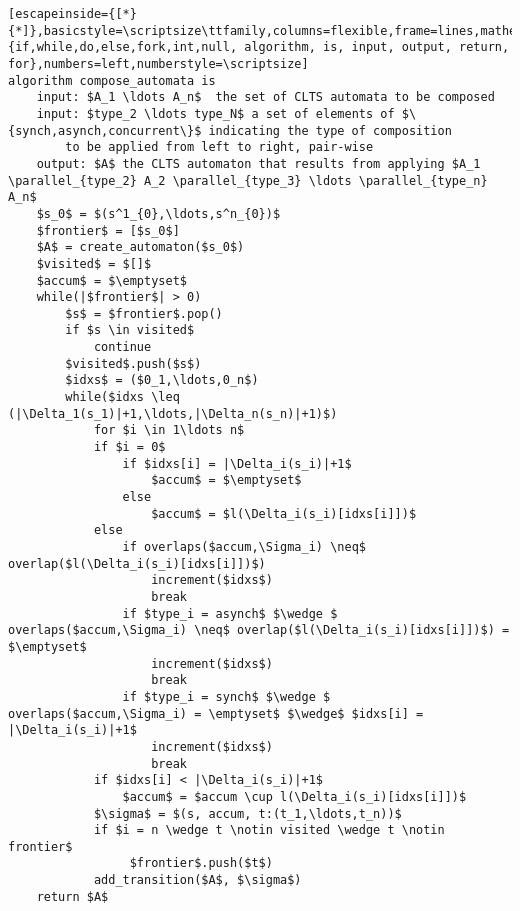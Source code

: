 \renewcommand{\ttdefault}{pcr}
\begin{lstlisting}[escapeinside={[*}{*]},basicstyle=\scriptsize\ttfamily,columns=flexible,frame=lines,mathescape=true,xleftmargin=3.0ex,keywordstyle=\textbf,morekeywords={if,while,do,else,fork,int,null, algorithm, is, input, output, return, for},numbers=left,numberstyle=\scriptsize]
algorithm compose_automata is
	input: $A_1 \ldots A_n$  the set of CLTS automata to be composed
	input: $type_2 \ldots type_N$ a set of elements of $\{synch,asynch,concurrent\}$ indicating the type of composition 
		to be applied from left to right, pair-wise
	output: $A$ the CLTS automaton that results from applying $A_1 \parallel_{type_2} A_2 \parallel_{type_3} \ldots \parallel_{type_n} A_n$
	$s_0$ = $(s^1_{0},\ldots,s^n_{0})$
	$frontier$ = [$s_0$]
	$A$ = create_automaton($s_0$)
	$visited$ = $[]$
	$accum$ = $\emptyset$
	while(|$frontier$| > 0)
		$s$ = $frontier$.pop()
		if $s \in visited$
			continue
		$visited$.push($s$)
		$idxs$ = ($0_1,\ldots,0_n$)
		while($idxs \leq (|\Delta_1(s_1)|+1,\ldots,|\Delta_n(s_n)|+1)$)
			for $i \in 1\ldots n$
			if $i = 0$
				if $idxs[i] = |\Delta_i(s_i)|+1$
					$accum$ = $\emptyset$
				else
					$accum$ = $l(\Delta_i(s_i)[idxs[i]])$
			else
				if overlaps($accum,\Sigma_i) \neq$ overlap($l(\Delta_i(s_i)[idxs[i]])$)
					increment($idxs$)
					break
				if $type_i = asynch$ $\wedge $ overlaps($accum,\Sigma_i) \neq$ overlap($l(\Delta_i(s_i)[idxs[i]])$) = $\emptyset$
					increment($idxs$)
					break					
				if $type_i = synch$ $\wedge $ overlaps($accum,\Sigma_i) = \emptyset$ $\wedge$ $idxs[i] = |\Delta_i(s_i)|+1$
					increment($idxs$)
					break	
			if $idxs[i] < |\Delta_i(s_i)|+1$
				$accum$ = $accum \cup l(\Delta_i(s_i)[idxs[i]])$
			$\sigma$ = $(s, accum, t:(t_1,\ldots,t_n))$
			if $i = n \wedge t \notin visited \wedge t \notin frontier$ 
				 $frontier$.push($t$)
			add_transition($A$, $\sigma$)			
	return $A$

\end{lstlisting}